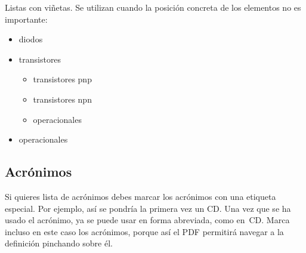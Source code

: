 Listas con viñetas. Se utilizan cuando la posición concreta de los elementos no es importante:

\begin{itemize}
\item diodos
\item transistores
    \begin{itemize}
    \item transistores pnp
    \item transistores npn
    \item operacionales
    \end{itemize}
\item operacionales
\end{itemize}

\subsection{Acrónimos}

Si quieres lista de acrónimos debes marcar los acrónimos con una etiqueta especial.  Por ejemplo, así se pondría la primera vez un \ac{CD}.  Una vez que se ha usado el acrónimo, ya se puede usar en forma abreviada, como en~\acs{CD}.  Marca incluso en este caso los acrónimos, porque así el PDF permitirá navegar a la definición pinchando sobre él.
